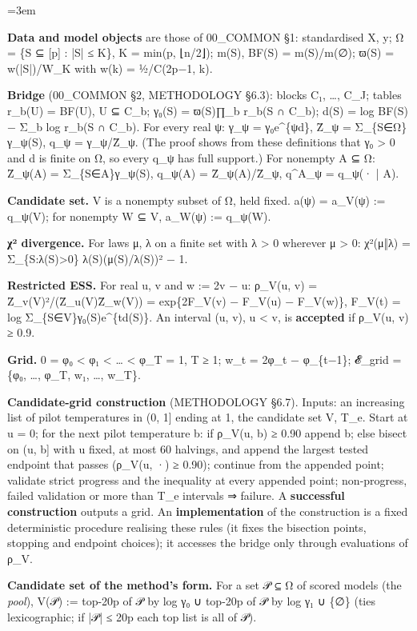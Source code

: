 \documentclass[11pt]{report}
\newenvironment{mdblock}{\begingroup\mdfont\raggedright\setlength{\parindent}{0pt}\setlength{\parskip}{0.55em}\emergencystretch=3em}{\par\endgroup}
\begin{document}
\begin{mdblock}
\begin{mdbul}
\item \textbf{Data and model objects} are those of 00\_COMMON §1: standardised X, y; Ω = \{S ⊆ [p] : |S| ≤ K\}, K = min(p, ⌊n/2⌋); m(S), BF(S) = m(S)/m(∅); ϖ(S) = w(|S|)/W\_K with w(k) = ½/C(2p−1, k).
\item \textbf{Bridge} (00\_COMMON §2, METHODOLOGY §6.3): blocks C₁, …, C\_J; tables r\_b(U) = BF(U), U ⊆ C\_b; γ₀(S) = ϖ(S)∏\_b r\_b(S ∩ C\_b); d(S) = log BF(S) − Σ\_b log r\_b(S ∩ C\_b). For every real ψ: γ\_ψ = γ₀e\textasciicircum{}\{ψd\}, Z̄\_ψ = Σ\_\{S∈Ω\}γ\_ψ(S), q\_ψ = γ\_ψ/Z̄\_ψ. (The proof shows from these definitions that γ₀ > 0 and d is finite on Ω, so every q\_ψ has full support.) For nonempty A ⊆ Ω: Z̄\_ψ(A) = Σ\_\{S∈A\}γ\_ψ(S), q\_ψ(A) = Z̄\_ψ(A)/Z̄\_ψ, q\textasciicircum{}A\_ψ = q\_ψ(· | A).
\item \textbf{Candidate set.} V is a nonempty subset of Ω, held fixed. a(ψ) = a\_V(ψ) := q\_ψ(V); for nonempty W ⊆ V, a\_W(ψ) := q\_ψ(W).
\item \textbf{χ² divergence.} For laws μ, λ on a finite set with λ > 0 wherever μ > 0: χ²(μ‖λ) = Σ\_\{S:λ(S)>0\} λ(S)(μ(S)/λ(S))² − 1.
\item \textbf{Restricted ESS.} For real u, v and w := 2v − u: ρ\_V(u, v) = Z̄\_v(V)²/(Z̄\_u(V)Z̄\_w(V)) = exp\{2F\_V(v) − F\_V(u) − F\_V(w)\}, F\_V(t) = log Σ\_\{S∈V\}γ₀(S)e\textasciicircum{}\{td(S)\}. An interval (u, v), u < v, is \textbf{accepted} if ρ\_V(u, v) ≥ 0.9.
\item \textbf{Grid.} 0 = φ₀ < φ₁ < … < φ\_T = 1, T ≥ 1; w\_t = 2φ\_t − φ\_\{t−1\}; 𝓔\_grid = \{φ₀, …, φ\_T, w₁, …, w\_T\}.
\item \textbf{Candidate-grid construction} (METHODOLOGY §6.7). Inputs: an increasing list of pilot temperatures in (0, 1] ending at 1, the candidate set V, T\_e. Start at u = 0; for the next pilot temperature b: if ρ\_V(u, b) ≥ 0.90 append b; else bisect on (u, b] with u fixed, at most 60 halvings, and append the largest tested endpoint that passes (ρ\_V(u, ·) ≥ 0.90); continue from the appended point; validate strict progress and the inequality at every appended point; non-progress, failed validation or more than T\_e intervals ⇒ failure. A \textbf{successful construction} outputs a grid. An \textbf{implementation} of the construction is a fixed deterministic procedure realising these rules (it fixes the bisection points, stopping and endpoint choices); it accesses the bridge only through evaluations of ρ\_V.
\item \textbf{Candidate set of the method's form.} For a set 𝒫 ⊆ Ω of scored models (the \emph{pool}), V(𝒫) := top-20p of 𝒫 by log γ₀ ∪ top-20p of 𝒫 by log γ₁ ∪ \{∅\} (ties lexicographic; if |𝒫| ≤ 20p each top list is all of 𝒫).

\end{mdbul}
\end{mdblock}
\end{document}
